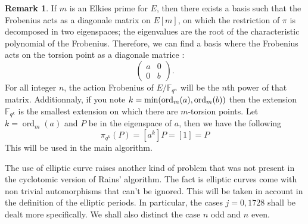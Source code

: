 \documentclass[12pt]{article}
\theoremstyle{plain}
\theoremstyle{definition}
\newtheorem*{remark}{Remark}
\DeclareMathOperator{\order}{ord} %
\def\F{\ensuremath{\mathbb{F}}}
\newcounter{algorithm}
\begin{document}
\begin{remark}
If $m$ is an Elkies prime for $E$, then there exists a basis such that the 
Frobenius acts as a diagonale matrix on $E[m]$, on which the restriction of
$\pi$ is decomposed in two eigenspaces; the eigenvalues are the root of the 
characteristic polynomial of the Frobenius. Therefore, we can find a basis where
the Frobenius acts on the torsion point as a diagonale matrice :
\begin{equation}
\begin{pmatrix}
a & 0\\
0 & b
\end{pmatrix}.
\end{equation}
For all integer $n$, the action Frobenius of $E/\F_{q^n}$ will be the $n$th
power of that matrix. Additionnaly, if you note $k =
\textup{min}(\order_m(a),\order_m(b))$ then the extension $\F_{q^k}$ is
the smallest extension on which there are $m$-torsion points. Let $k = \order_m(a)$
and $P$ be in the eigenspace of $a$, then we have the following
\begin{equation}
\pi_{q^k}(P) = [a^k]P = [1] = P
\end{equation}
This will be used in the main algorithm.
\end{remark}

The use of elliptic curve raises another kind of problem that was not present 
in the cyclotomic version of Rains' algorithm. The fact is elliptic curves 
come with non trivial automorphisms that can't be ignored. This will be taken 
in account in the definition of the elliptic periods. In particular, the cases 
$j = 0, 1728$ shall be dealt more specifically. We shall also distinct the case
$n$ odd and $n$ even.\par
\end{document}
